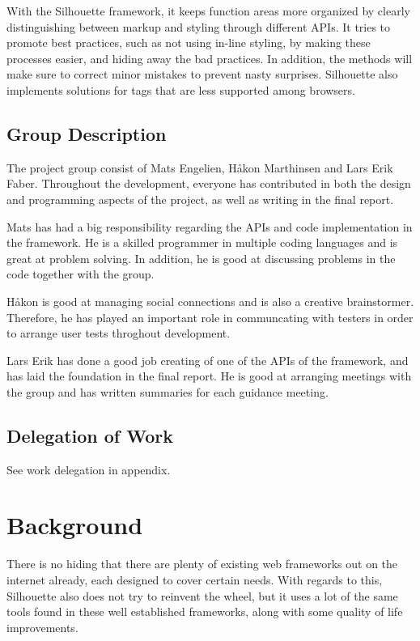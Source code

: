 \documentclass[12pt]{article}
\begin{document}
With the Silhouette framework, it keeps function areas more organized by clearly distinguishing between markup and styling through different APIs. It tries to promote best practices, such as not using in-line styling, by making these processes easier, and hiding away the bad practices. In addition, the methods will make sure to correct minor mistakes to prevent nasty surprises. Silhouette also implements solutions for tags that are less supported among browsers. 

    \subsection{Group Description}
    
    The project group consist of Mats Engelien, Håkon Marthinsen and Lars Erik Faber. Throughout the development, everyone has contributed in both the design and programming aspects of the project, as well as writing in the final report. 

    Mats has had a big responsibility regarding the APIs and code implementation in the framework. He is a skilled programmer in multiple coding languages and is great at problem solving. In addition, he is good at discussing problems in the code together with the group.

    Håkon is good at managing social connections and is also a creative brainstormer. Therefore, he has played an important role in communcating with testers in order to arrange user tests throghout development.

    Lars Erik has done a good job creating of one of the APIs of the framework, and has laid the foundation in the final report. He is good at arranging meetings with the group and has written summaries for each guidance meeting.


    \subsection{Delegation of Work}

    See work delegation in appendix.

\section{Background}

There is no hiding that there are plenty of existing web frameworks out on the internet already, each designed to cover certain needs. With regards to this, Silhouette also does not try to reinvent the wheel, but it uses a lot of the same tools found in these well established frameworks, along with some quality of life improvements.
\end{document}
